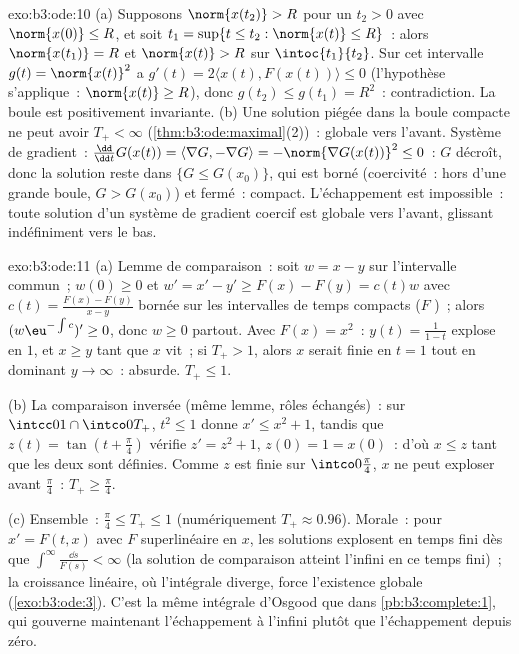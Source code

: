 \begin{solution}{exo:b3:ode:10}
(a) Supposons $\norm{x(t_2)} > R$ pour un $t_2 > 0$ avec
$\norm{x(0)} \leq R$, et soit $t_1 = \sup\{t \leq t_2 :
\norm{x(t)} \leq R\}$~: alors $\norm{x(t_1)} = R$ et
$\norm{x(t)} > R$ sur $\intoc{t_1}{t_2}$. Sur cet intervalle
$g(t) = \norm{x(t)}^2$ a $g'(t) = 2\langle x(t),
F(x(t))\rangle \leq 0$ (l'hypothèse s'applique~:
$\norm{x(t)} \geq R$), donc $g(t_2) \leq g(t_1) = R^2$~:
contradiction. La boule est positivement invariante.
(b) Une solution piégée dans la boule compacte ne peut avoir
$T_+ < \infty$ (\cref{thm:b3:ode:maximal}(2))~: globale vers
l'avant. Système de gradient~: $\frac{\dd}{\dd t}G(x(t)) =
\langle\nabla G, -\nabla G\rangle = -\norm{\nabla G(x(t))}^2
\leq 0$~: $G$ décroît, donc la solution reste dans $\{G \leq
G(x_0)\}$, qui est borné (coercivité~: hors d'une grande
boule, $G > G(x_0)$) et fermé~: compact. L'échappement est
impossible~: toute solution d'un système de gradient coercif
est globale vers l'avant, glissant indéfiniment vers le bas.
\end{solution}

\begin{solution}{exo:b3:ode:11}
(a) Lemme de comparaison~: soit $w = x - y$ sur l'intervalle
commun~; $w(0) \geq 0$ et $w' = x' - y' \geq F(x) - F(y) =
c(t)w$ avec $c(t) = \frac{F(x) - F(y)}{x - y}$ bornée sur les
intervalles de temps compacts ($F$ )~; alors $(w\eu^{-\int c})' \geq 0$, donc $w
\geq 0$ partout. Avec $F(x) = x^2$~: $y(t) = \frac1{1 - t}$
explose en $1$, et $x \geq y$ tant que $x$ vit~; si $T_+ >
1$, alors $x$ serait finie en $t = 1$ tout en dominant $y \to
\infty$~: absurde. $T_+ \leq 1$.

(b) La comparaison inversée (même lemme, rôles échangés)~:
sur $\intcc01\cap\intco0{T_+}$, $t^2 \leq 1$ donne $x' \leq
x^2 + 1$, tandis que $z(t) = \tan(t + \frac\pi4)$ vérifie
$z' = z^2 + 1$, $z(0) = 1 = x(0)$~: d'où $x \leq z$ tant que
les deux sont définies. Comme $z$ est finie sur
$\intco0{\frac\pi4}$, $x$ ne peut exploser avant
$\frac\pi4$~: $T_+ \geq \frac\pi4$.

(c) Ensemble~: $\frac\pi4 \leq T_+ \leq 1$ (numériquement
$T_+ \approx 0.96$). Morale~: pour $x' = F(t, x)$ avec $F$
superlinéaire en $x$, les solutions explosent en temps fini
dès que $\int^\infty\frac{\dd s}{F(s)} < \infty$ (la solution
de comparaison atteint l'infini en ce temps fini)~; la
croissance linéaire, où l'intégrale diverge, force
l'existence globale (\cref{exo:b3:ode:3}). C'est la même
intégrale d'Osgood que dans \cref{pb:b3:complete:1}, qui
gouverne maintenant l'échappement à l'infini plutôt que
l'échappement depuis zéro.
\end{solution}

